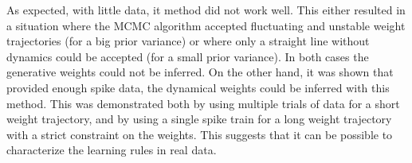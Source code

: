 As expected, with little data, it method did not work well. This either resulted in a situation where the MCMC algorithm accepted fluctuating and unstable weight trajectories (for a big prior variance) or where only a straight line without dynamics could be accepted (for a small prior variance). In both cases the generative weights could not be inferred. On the other hand, it was shown that provided enough spike data, the dynamical weights could be inferred with this method. This was demonstrated both by using multiple trials of data for a short weight trajectory, and by using a single spike train for a long weight trajectory with a strict constraint on the weights. This suggests that it can be possible to characterize the learning rules in real data.






\cleardoublepage